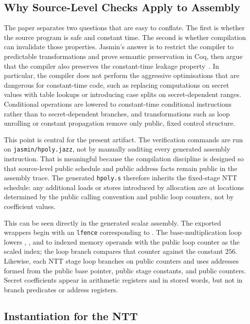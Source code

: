 \subsection{Why Source-Level Checks Apply to Assembly}

The \jasmin{} paper separates two questions that are easy to conflate.  The
first is whether the source program is safe and constant time.  The second is
whether compilation can invalidate those properties.  Jasmin's answer is to
restrict the compiler to predictable transformations and prove semantic
preservation in Coq, then argue that the compiler also preserves the
constant-time leakage property~\cite{Almeida2017}.  In particular, the compiler
does not perform the aggressive optimisations that are dangerous for
constant-time code, such as replacing computations on secret values with table
lookups or introducing case splits on secret-dependent ranges.  Conditional
operations are lowered to constant-time conditional instructions rather than to
secret-dependent branches, and transformations such as loop unrolling or
constant propagation remove only public, fixed control structure.

This point is central for the present artifact.  The verification commands are
run on \texttt{jasmin/hpoly.jazz}, not by manually auditing every generated
assembly instruction.  That is meaningful because the \jasmin{} compilation
discipline is designed so that source-level public schedule and public address
facts remain public in the assembly trace.  The generated \texttt{hpoly.s}
therefore inherits the fixed-stage NTT schedule: any additional loads or stores
introduced by allocation are at locations determined by the public calling
convention and public loop counters, not by coefficient values.

This can be seen directly in the generated scalar assembly.  The exported
wrappers begin with an \texttt{lfence} corresponding to .
The base-multiplication loop lowers , , and
 to indexed memory operands with the public loop counter as the
scaled index; the loop branch compares that counter against the constant
\(256\).  Likewise, each NTT stage loop branches on public counters and uses
addresses formed from the public base pointer, public stage constants, and
public counters.  Secret coefficients appear in arithmetic registers and in
stored words, but not in branch predicates or address registers.

\subsection{Instantiation for the \haetae{} NTT}

